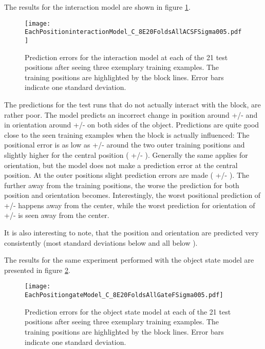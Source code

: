 The results for the interaction model are shown in figure \ref{fig:eachPosInteraction}.

\begin{figure}
\centering
\texttt{[image: EachPositioninteractionModel\_C\_8E20FoldsAllACSFSigma005.pdf]}
\caption{Prediction errors for the interaction model at each of the 21 test positions after seeing three exemplary training examples. The training positions are highlighted by the block lines. Error bars indicate one standard deviation.}
\label{fig:eachPosInteraction}
\end{figure}

The predictions for the test runs that do not actually interact with the block, are rather poor. The model predicts an incorrect change in position around  +/-  and in orientation around  +/-  on both sides of the object. 
Predictions are quite good close to the seen training examples when the block is actually influenced: The positional error is as low as  +/-  around the two outer training positions and slightly higher for the central position ( +/- ). Generally the same applies for orientation, but the model does not make a prediction error at the central position. At the outer positions slight prediction errors are made ( +/- ).
The further away from the training positions, the worse the prediction for both position and orientation becomes. Interestingly, the worst positional prediction of  +/-   happens  away from the center, while the worst prediction for orientation of  +/-  is seen  away from the center.

It is also interesting to note, that the position and orientation are predicted very consistently (most standard deviations below  and all below ).

The results for the same experiment performed with the object state model are presented in figure \ref{fig:eachPosGate}.

\begin{figure}
\centering
\texttt{[image: EachPositiongateModel\_C\_8E20FoldsAllGateFSigma005.pdf]}
\caption{Prediction errors for the object state model at each of the 21 test positions after seeing three exemplary training examples. The training positions are highlighted by the block lines. Error bars indicate one standard deviation.}
\label{fig:eachPosGate}
\end{figure}

